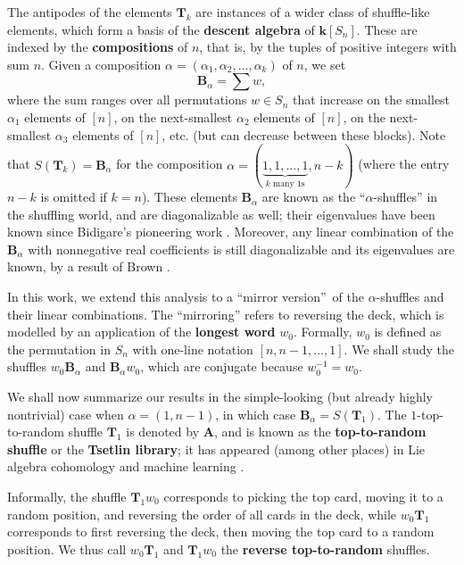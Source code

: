 \documentclass[12pt]{article}
\theoremstyle{definition}%
\theoremstyle{definition}%
\theoremstyle{remark}%
\newcommand{\tup}[1]{\left( #1 \right)}
\newcommand{\interval}[1]{\left[ #1 \right]} %
\newcommand{\ponl}[1]{\left[ #1 \right]} %
\newcommand{\kk}{\mathbf{k}}
\newcommand{\ksn}{\kk\left[S_n\right]}
\newcommand{\A}{\mathbf{A}}
\newcommand{\BBa}{\mathbf{B}_{\alpha}}
\newcommand{\TT}{\mathbf{T}}
\newcommand{\wo}{w_0} %
\newcommand{\defin}[1]{\textbf{#1}}
\begin{document}
The antipodes of the elements $\TT_k$ are instances of a wider class of shuffle-like elements, which form a basis of the \defin{descent algebra} of $\ksn$.
These are indexed by the \defin{compositions} of $n$, that is, by the tuples of positive integers with sum $n$.
Given a composition $\alpha = \tup{\alpha_1, \alpha_2, \ldots, \alpha_k}$ of $n$, we set
\[
\BBa = \sum w,
\]
where the sum ranges over all permutations $w \in S_n$ that increase on the smallest $\alpha_1$ elements of $\interval{n}$, on the next-smallest $\alpha_2$ elements of $\interval{n}$, on the next-smallest $\alpha_3$ elements of $\interval{n}$, etc. (but can decrease between these blocks).
Note that $S\tup{ \TT_k } = \BBa$ for the composition $\alpha = \tup{\underbrace{1, 1, \ldots, 1}_{k \text{ many $1$s}}, n-k}$ (where the entry $n-k$ is omitted if $k=n$).
These elements $\BBa$ are known as the ``$\alpha$-shuffles'' in the shuffling world, and are diagonalizable as well; their eigenvalues have been known since Bidigare's pioneering work \cite[\S 4.1.9]{Bidigare-thesis}.
Moreover, any linear combination of the $\BBa$ with nonnegative real coefficients is still diagonalizable and its eigenvalues are known, by a result of Brown \cite[Theorem 4.1]{Schocker}.

In this work, we extend this analysis to a ``mirror version''\ of the $\alpha$-shuffles and their linear combinations.
The ``mirroring'' refers to reversing the deck, which is modelled by an application of the \defin{longest word} $\wo$.
Formally, $\wo$ is defined as the permutation in $S_n$ with one-line notation $ \ponl{ n,n-1,\dots,1 } $.
We shall study the shuffles $ \wo\BBa $ and $ \BBa\wo $, which are conjugate because $\wo^{-1} = \wo$.

We shall now summarize our results in the simple-looking (but already highly nontrivial) case when $\alpha = \tup{1, n-1}$, in which case $\BBa = S\tup{ \TT_1 }$.
The $1$-top-to-random shuffle $\TT_1$ is denoted by $\A$, and is known as the \defin{top-to-random shuffle} or the \defin{Tsetlin library}; it has appeared (among other places) in Lie algebra cohomology \cite[Appendix]{Wallach} and machine learning \cite[Lemma 29]{Reizen19}.

Informally, the shuffle $\TT_1\wo$ corresponds to picking the top card, moving it to a random position, and reversing the order of all cards in the deck, while $\wo\TT_1$ corresponds to first reversing the deck, then moving the top card to a random position.
We thus call $ \wo\TT_{1} $ and $ \TT_{1}\wo $ the \defin{reverse top-to-random} shuffles.
\end{document}
